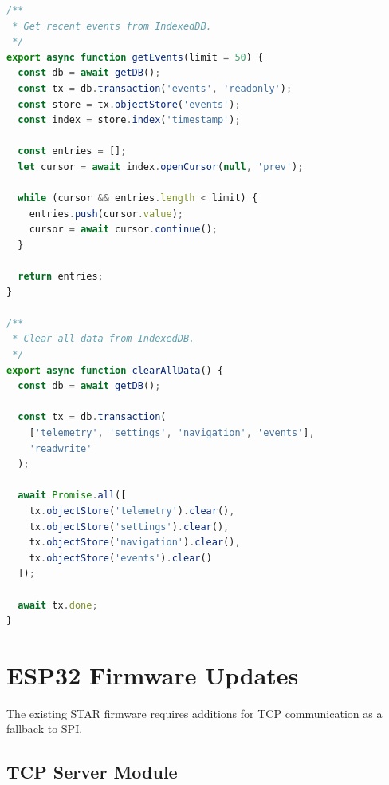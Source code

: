 \documentclass[11pt,letterpaper]{article}
\begin{document}
\begin{lstlisting}[language=JavaScript, caption=src/storage/indexedDB.js]
/**
 * Get recent events from IndexedDB.
 */
export async function getEvents(limit = 50) {
  const db = await getDB();
  const tx = db.transaction('events', 'readonly');
  const store = tx.objectStore('events');
  const index = store.index('timestamp');

  const entries = [];
  let cursor = await index.openCursor(null, 'prev');

  while (cursor && entries.length < limit) {
    entries.push(cursor.value);
    cursor = await cursor.continue();
  }

  return entries;
}

/**
 * Clear all data from IndexedDB.
 */
export async function clearAllData() {
  const db = await getDB();

  const tx = db.transaction(
    ['telemetry', 'settings', 'navigation', 'events'],
    'readwrite'
  );

  await Promise.all([
    tx.objectStore('telemetry').clear(),
    tx.objectStore('settings').clear(),
    tx.objectStore('navigation').clear(),
    tx.objectStore('events').clear()
  ]);

  await tx.done;
}
\end{lstlisting}

\section{ESP32 Firmware Updates}

The existing STAR firmware requires additions for TCP communication as a fallback to SPI.

\subsection{TCP Server Module}
\end{document}
